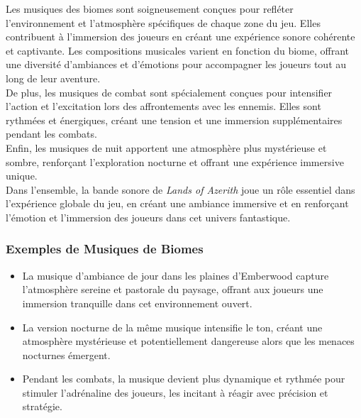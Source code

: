 Les musiques des biomes sont soigneusement conçues pour refléter l'environnement et l'atmosphère spécifiques de chaque zone du jeu. Elles contribuent à l'immersion des joueurs en créant une expérience sonore cohérente et captivante.
Les compositions musicales varient en fonction du biome, offrant une diversité d'ambiances et d'émotions pour accompagner les joueurs tout au long de leur aventure.
\\

De plus, les musiques de combat sont spécialement conçues pour intensifier l'action et l'excitation lors des affrontements avec les ennemis.
Elles sont rythmées et énergiques, créant une tension et une immersion supplémentaires pendant les combats.
\\

Enfin, les musiques de nuit apportent une atmosphère plus mystérieuse et sombre, renforçant l'exploration nocturne et offrant une expérience immersive unique.
\\

Dans l'ensemble, la bande sonore de \textit{Lands of Azerith} joue un rôle essentiel dans l'expérience globale du jeu, en créant une ambiance immersive et en renforçant l'émotion et l'immersion des joueurs dans cet univers fantastique.

\subsubsection{Exemples de Musiques de Biomes}

\begin{itemize}

      \item La musique d'ambiance de jour dans les plaines d'Emberwood capture l'atmosphère sereine et pastorale du paysage, offrant aux joueurs une immersion tranquille dans cet environnement ouvert.
            \\

      \item La version nocturne de la même musique intensifie le ton, créant une atmosphère mystérieuse et potentiellement dangereuse alors que les menaces nocturnes émergent.
            \\

      \item Pendant les combats, la musique devient plus dynamique et rythmée pour stimuler l'adrénaline des joueurs, les incitant à réagir avec précision et stratégie.
            \\

\end{itemize}


